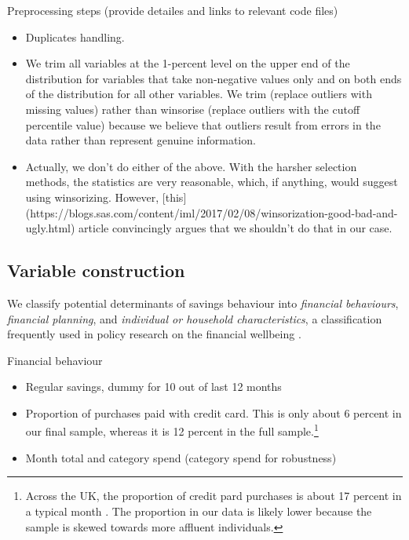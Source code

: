 Preprocessing steps
(provide detailes and links to relevant code files)
\begin{itemize}
    \item Duplicates handling.
    \item We trim all variables at the 1-percent level on the upper end of the
        distribution for variables that take non-negative values only and on
        both ends of the distribution for all other variables. We trim
        (replace outliers with missing values) rather than winsorise (replace
        outliers with the cutoff percentile value) because we believe that
        outliers result from errors in the data rather than represent genuine
        information.
    \item Actually, we don't do either of the above. With the harsher selection
        methods, the statistics are very reasonable, which, if anything, would
        suggest using winsorizing. However,
        [this](https://blogs.sas.com/content/iml/2017/02/08/winsorization-good-bad-and-ugly.html)
        article convincingly argues that we shouldn't do that in our case.
\end{itemize}

\subsection{Variable construction}%
\label{sub:variable_construction}

We classify potential determinants of savings behaviour into \textit{financial behaviours},
\textit{financial planning}, and \textit{individual or household
characteristics}, a classification frequently used in policy research on
the financial wellbeing \citep{can2019improving,cfpb2017financial, mps2018building}.

Financial behaviour

\begin{itemize}
    \item Regular savings, dummy for 10 out of last 12 months

    \item Proportion of purchases paid with credit card. This is only about 6
        percent in our final sample, whereas it is 12 percent in the full
        sample.\footnote{Across the UK, the proportion of credit pard purchases
            is about 17 percent in a typical month \citep{ukfinance2021card}.
            The proportion in our data is likely lower because the sample is
        skewed towards more affluent individuals.}

    \item Month total and category spend (category spend for robustness)
\end{itemize}

